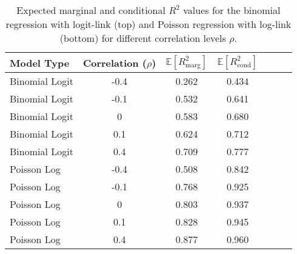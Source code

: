 \begin{table}[H]
    \centering
    \begin{tabular}{lcccccc}
    \toprule
    \textbf{Model Type} & \textbf{Correlation (\(\rho\))} & $\mathbb{E}[R^2_{\text{marg}}]$ &  $\mathbb{E}[R^2_{\text{cond}}]$ \\
    \midrule
    Binomial Logit & -0.4 & 0.262 & 0.434 \\
    Binomial Logit & -0.1 & 0.532 & 0.641 \\
    Binomial Logit & 0    & 0.583 & 0.680 \\
    Binomial Logit & 0.1  & 0.624 & 0.712 \\
    Binomial Logit & 0.4  & 0.709 & 0.777 \\
    \midrule
    Poisson Log  & -0.4 & 0.508 & 0.842 \\
    Poisson Log  & -0.1 & 0.768 & 0.925 \\
    Poisson Log  & 0    & 0.803 & 0.937 \\
    Poisson Log  & 0.1  & 0.828 & 0.945 \\
    Poisson Log  & 0.4  & 0.877 & 0.960 \\
    \bottomrule
    \end{tabular}
    \caption{Expected marginal and conditional $R^2$ values for the binomial regression with logit-link (top) and Poisson regression with log-link (bottom) for different correlation levels $\rho$.}
    \label{table:r2values}
\end{table}





